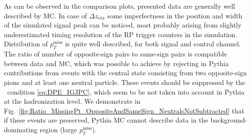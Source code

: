 As can be observed in the comparison plots, presented data are generally well described by MC. In case of $\Delta z_{\text{vtx}}$ some imperfectness in the position and width of the simulated signal peak can be noticed, most probably arising from slightly underestimated timing resolution of the RP trigger counters in the simulation. Distribution of $p_{T}^{\text{miss}}$ is quite well described, for both signal and control channel. The ratio of number of opposite-sign pairs to same-sign pairs is compatible between data and MC, which was possible to achieve by rejecting in Pythia contributions from events with the central state consisting from two opposite-sign pions and at least one neutral particle. These events should be suppressed by the \DPE\ condition \eqref{eq:DPE_IGJPC}, which seem to be not taken into account in Pythia at the hadronization level. We demonstrate in Fig.~\ref{fig:Ratio_MissingPt_OppositeAndSameSign_NeutralsNotSubtracted} that if these events are preserved, Pythia MC cannot describe data in the background-dominating region (large $p_{T}^{\text{miss}}$).

